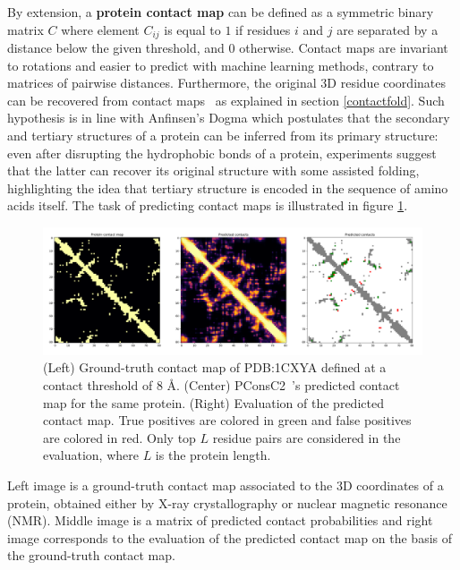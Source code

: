         By extension, a \textbf{protein contact map} can be defined as a symmetric binary matrix $C$ where element $C_{ij}$ 
        is equal to $1$ if residues $i$ and $j$
        are separated by a distance below the given threshold, and $0$ otherwise.
        Contact maps are invariant to rotations and easier to predict
        with machine learning methods, contrary to matrices of pairwise distances.
        Furthermore, the original 3D residue coordinates can be recovered from
        contact maps~\cite{10.1007/978-3-540-72031-7_53} as explained in section \ref{contactfold}.
        Such hypothesis is in line with Anfinsen's Dogma which postulates that the secondary and tertiary structures
        of a protein can be inferred from its primary structure:
        even after disrupting the hydrophobic bonds of a protein, experiments suggest
        that the latter can recover its original structure with some assisted folding,
        highlighting the idea that tertiary structure is encoded in the sequence of amino acids itself.
        The task of predicting contact maps is illustrated in figure \ref{cmaps}.

        \begin{figure}[H]
            \begin{center}
                \includegraphics[width=\textwidth, keepaspectratio]{imgs/1CXYA.png}
                \caption{(Left) Ground-truth contact map of PDB:1CXYA defined at a contact threshold of 8 \AA{}.
                    (Center) PConsC2~\cite{10.1371/journal.pcbi.1003889}'s
                    predicted contact map for the same protein. (Right) Evaluation of the predicted contact map.
                    True positives are colored in green and false positives are colored in red. Only top $L$ residue pairs
                    are considered in the evaluation, where $L$ is the protein length.}
                \label{cmaps}
            \end{center}
        \end{figure}

        Left image is a ground-truth contact map associated to the 3D coordinates of a protein, obtained either by
        X-ray crystallography or nuclear magnetic resonance (NMR).
        Middle image is a matrix of predicted contact probabilities and right image corresponds to the evaluation
        of the predicted contact map on the basis of the ground-truth contact map.


